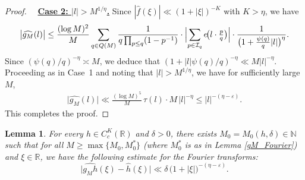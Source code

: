 \documentclass[12pt,a4paper,twoside]{article}
\newtheorem{lem}{Lemma}[section]
\begin{document}
\begin{proof}
\medskip

\noindent{}~~\underline{\textbf{Case 2: $|l| > M^{1/\eta}$.}}
Since $|\widehat{f}(\xi)| \ll (1+|\xi|)^{-K}$ with $K>\eta$, we have
\[
\bigl|\widehat{g_M}(l)\bigr|
\le \frac{(\log M)^2}{M} \sum_{q\in Q(M)} \frac{1}{q\prod_{p\le q}(1-p^{-1})} \cdot \Bigl|\sum_{p\in\mathcal{I}_q} e\!\bigl(l\cdot \tfrac{p}{q}\bigr)\Bigr| \cdot \frac{1}{\bigl(1+\frac{\psi(q)}{q}|l|\bigr)^{\eta}}.
\]
Since $({\psi(q)}/{q})^{-\eta}\asymp M$, we deduce that  $(1+ |l|{\psi(q)}/{q})^{-\eta}\ll M|l|^{-\eta}$. Proceeding as in Case~1 and noting that \(|l| > M^{1/\eta}\), we have for sufficiently large \(M\),
\begin{align*}
\bigl|\widehat{g_M}(l)\bigr|
\ll \frac{(\log M)^5}{M} \, \tau(l) \cdot M \, |l|^{-\eta}
\le |l|^{-(\eta-\varepsilon)}.
\end{align*}
This completes the proof.


\end{proof}



\begin{lem}\label{stability}
For every $h \in C_c^{K}(\mathbb{R})$ and $\delta > 0$, there exists   $M_0 = M_0(h, \delta)\in\mathbb{N}$ such that for all
$M \ge \max\{M_0,M_{0}^{\ast}\}$ (where $M_{0}^{\ast}$ is as in Lemma \ref{gM_Fourier}) and   $\xi \in \mathbb{R}$, we have the following estimate for the Fourier transforms:
\[
\bigl| \widehat{g_M h}(\xi) - \widehat{h}(\xi) \bigr| \ll \delta \, \bigl( 1 + |\xi| \bigr)^{-(\eta -\varepsilon)}.
\]
\end{lem}
\end{document}
